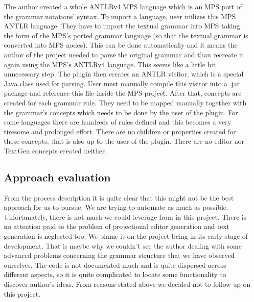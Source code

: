 The author created a whole ANTLRv4 MPS language which is an MPS port of the grammar notations' syntax. To import a language, user utilizes this MPS ANTLR language. They have to import the textual grammar into MPS taking the form of the MPS's ported grammar language (so that the textual grammar is converted into MPS nodes). This can be done automatically and it means the author of the project needed to parse the original grammar and than recreate it again using the MPS's ANTLRv4 language. This seems like a little bit unnecessary step. The plugin then creates an ANTLR visitor, which is a special Java class used for parsing. User must manually compile this visitor into a .jar package and reference this file inside the MPS project. After that, concepts are created for each grammar rule. They need to be mapped manually together with the grammar's concepts which needs to be done by the user of the plugin. For some languages there are hundreds of rules defined and this becomes a very tiresome and prolonged effort. There are no children or properties created for these concepts, that is also up to the user of the plugin. There are no editor nor TextGen concepts created neither.

\subsection{Approach evaluation}
From the process description it is quite clear that this might not be the best approach for us to pursue. We are trying to automate as much as possible. Unfortunately, there is not much we could leverage from in this project. There is no attention paid to the problem of projectional editor generation and text generation is neglected too. We blame it on the project being in its early stage of development. That is maybe why we couldn't see the author dealing with some advanced problems concerning the grammar structure that we have observed ourselves. The code is not documented much and is quite dispersed across different aspects, so it is quite complicated to locate some functionality to discover author's ideas. From reasons stated above we decided not to follow up on this project.